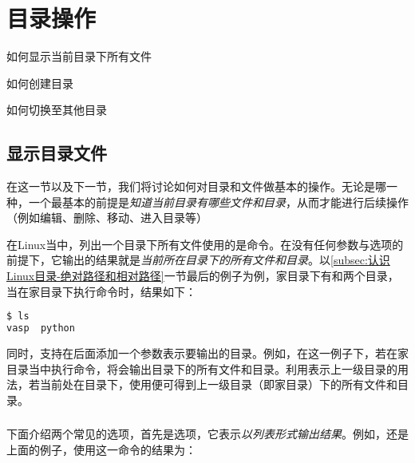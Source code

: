 \section{目录操作}\label{sec:目录操作}

\begin{Abstract}
    \item 如何显示当前目录下所有文件
    \item 如何创建目录
    \item 如何切换至其他目录
\end{Abstract}


\subsection{显示目录文件}\label{subsec:目录操作-显示目录文件}

在这一节以及下一节，我们将讨论如何对目录和文件做基本的操作。无论是哪一种，一个最基本的前提是\emph{知道当前目录有哪些文件和目录}，从而才能进行后续操作（例如编辑、删除、移动、进入目录等）

在Linux当中，列出一个目录下所有文件使用的是命令。在没有任何参数与选项的前提下，它输出的结果就是\emph{当前所在目录下的所有文件和目录}。以\ref{subsec:认识Linux目录-绝对路径和相对路径}一节最后的例子为例，家目录下有和两个目录，当在家目录下执行命令时，结果如下：

\begin{lstlisting}[language=bash]
$ ls
vasp  python
\end{lstlisting}

同时，支持在后面添加一个参数表示要输出的目录。例如，在这一例子下，若在家目录当中执行命令，将会输出目录下的所有文件和目录。利用表示上一级目录的用法，若当前处在目录下，使用便可得到上一级目录（即家目录）下的所有文件和目录。

\subsubsection{}

下面介绍两个常见的选项，首先是选项，它表示\emph{以列表形式输出结果}。例如，还是上面的例子，使用这一命令的结果为：

